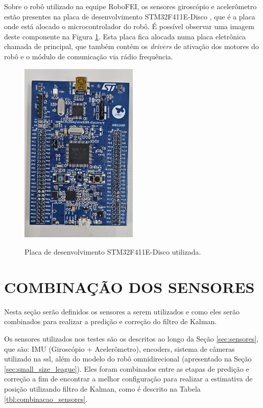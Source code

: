 \documentclass[acronym, symbols, table]{fei}
\begin{document}
		Sobre o robô utilizado na equipe RoboFEI, os sensores giroscópio e acelerômetro estão presentes na placa de desenvolvimento STM32F411E-Disco \cite{datasheet_micro}, que é a placa onde está alocado o microcontrolador do robô. É possível observar uma imagem deste componente na Figura \ref{fig:stm32f411}. Esta placa fica alocada numa placa eletrônica chamada de principal, que também contém os \textit{drivers} de ativação dos motores do robô e o módulo de comunicação via rádio frequência.
		
		\begin{figure}[!htb]
			\centering
			\caption{Placa de desenvolvimento STM32F411E-Disco utilizada.}
			\includegraphics[width=0.5\textwidth]{stm32f411.jpg}
			\label{fig:stm32f411}
		\end{figure}
		
	\section{COMBINAÇÃO DOS SENSORES}\label{sec_metodologia_comb_sensores}
	
		Nesta seção serão definidos os sensores a serem utilizados e como eles serão combinados para realizar a predição e correção do filtro de Kalman.
		
		Os sensores utilizados nos testes são os descritos ao longo da Seção \ref{sec:sensores}, que são: IMU (Giroscópio + Acelerômetro), encoders, sistema de câmeras utilizado na \acrshort{ssl}, além do modelo do robô omnidirecional (apresentado na Seção \ref{sec:small_size_league}). Eles foram combinados entre as etapas de predição e correção a fim de encontrar a melhor configuração para realizar a estimativa de posição utilizando filtro de Kalman, como é descrito na Tabela \ref{tbl:combinacao_sensores}.
		
\end{document}

